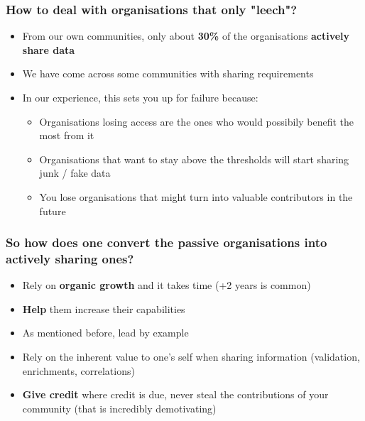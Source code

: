 \begin{frame}
\frametitle{How to deal with organisations that only "leech"?}
\begin{itemize}
    \item From our own communities, only about {\bf 30\%} of the organisations {\bf actively share data}
	\item We have come across some communities with sharing requirements
	\item In our experience, this sets you up for failure because:
	\begin{itemize}
		\item Organisations losing access are the ones who would possibily benefit the most from it
		\item Organisations that want to stay above the thresholds will start sharing junk / fake data
		\item You lose organisations that might turn into valuable contributors in the future
	\end{itemize}
\end{itemize}
\end{frame}

\begin{frame}
\frametitle{So how does one convert the passive organisations into actively sharing ones?}
\begin{itemize}
    \item Rely on {\bf organic growth} and it takes time (+2 years is common)
    \item {\bf Help} them increase their capabilities
	\item As mentioned before, lead by example
	\item Rely on the inherent value to one's self when sharing information (validation, enrichments, correlations)
    \item {\bf Give credit} where credit is due, never steal the contributions of your community (that is incredibly demotivating)
\end{itemize}
\end{frame}

